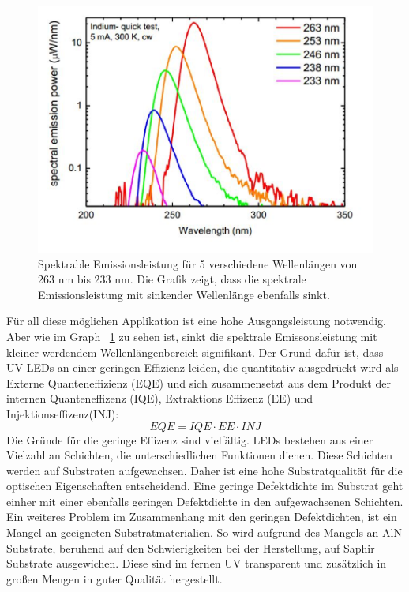 \begin{figure}[htb]
    \centering
    \begin{minipage}[t]{0.49\linewidth}
        \centering
        \includegraphics[width=\linewidth]{Bilder/SpectralEmissionPower_Wavelength.png}
        \caption{Spektrable Emissionsleistung für 5 verschiedene Wellenlängen von 263 nm bis 233 nm. Die Grafik zeigt, dass die spektrale Emissionsleistung mit sinkender Wellenlänge ebenfalls sinkt\cite{semreich}.}
        \label{fig:specPowWVL}
    \end{minipage}
\end{figure}
\vspace{1cm}
\newline
Für all diese möglichen Applikation ist eine hohe Ausgangsleistung notwendig. Aber wie im Graph ~\ref{fig:specPowWVL} zu sehen ist, sinkt die spektrale Emissonsleistung mit kleiner werdendem Wellenlängenbereich signifikant. Der Grund dafür ist, dass UV-LEDs an einer geringen Effizienz leiden, die quantitativ ausgedrückt wird als Externe Quanteneffizienz (EQE) und sich zusammensetzt aus dem Produkt der internen Quanteneffizenz (IQE), Extraktions Effizenz (EE) und Injektionseffizenz(INJ):
%
\begin{equation}
    EQE = IQE \cdot EE \cdot INJ
\end{equation}
%
Die Gründe für die geringe Effizenz sind vielfältig. LEDs bestehen aus einer Vielzahl an Schichten, die unterschiedlichen Funktionen dienen. Diese Schichten werden auf Substraten aufgewachsen. Daher ist eine hohe Substratqualität für die optischen Eigenschaften entscheidend. Eine geringe Defektdichte im Substrat geht einher mit einer ebenfalls geringen Defektdichte in den aufgewachsenen Schichten. Ein weiteres Problem im Zusammenhang mit den geringen Defektdichten, ist ein Mangel an geeigneten Substratmaterialien. So wird aufgrund des Mangels an AlN Substrate, beruhend auf den Schwierigkeiten bei der Herstellung, auf Saphir Substrate ausgewichen. Diese sind im fernen UV transparent und zusätzlich in großen Mengen in guter Qualität hergestellt.
